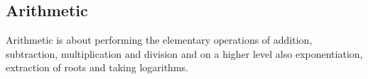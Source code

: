 
%
% 









\subsection{Arithmetic}
Arithmetic is about performing the elementary operations of addition, subtraction, multiplication and division and on a higher level also exponentiation, extraction of roots and taking logarithms. 


